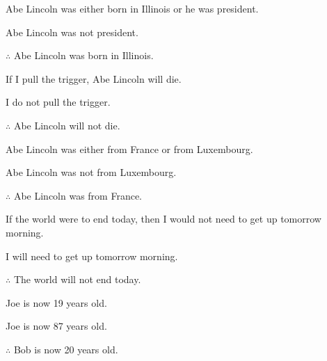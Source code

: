 \begin{practiceproblems}
\begin{earg}
\item Abe Lincoln was either born in Illinois or he was president.
\item Abe Lincoln was not president.
\item[$\therefore$] Abe Lincoln was born in Illinois. \hfill {}
\end{earg}

\begin{earg}
\item If I pull the trigger, Abe Lincoln will die.
\item I do not pull the trigger.
\item[$\therefore$] Abe Lincoln will not die. \hfill {}
\end{earg}

\begin{earg}
\item Abe Lincoln was either from France or from Luxembourg.
\item Abe Lincoln was not from Luxembourg.
\item[$\therefore$] Abe Lincoln was from France. \hfill {}
\end{earg}

\begin{earg}
\item If the world were to end today, then I would not need to get up tomorrow morning.
\item I will need to get up tomorrow morning.
\item[$\therefore$] The world will not end today. \hfill {}
\end{earg}

\begin{earg}
\item Joe is now 19 years old.
\item Joe is now 87 years old.
\item[$\therefore$] Bob is now 20 years old. \hfill {}
\end{earg}




\end{practiceproblems}
